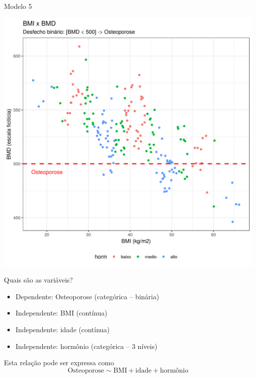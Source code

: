 \documentclass{beamer}
\begin{document}
\begin{frame}{\scriptsize Modelo 5}
  \begin{center}
    \includegraphics[height=.9\textheight]{Cap31-32/pratica-glm5}
  \end{center}
\end{frame}

\begin{frame}{\scriptsize Quais são as variáveis?}
  \begin{itemize}
  \item \alert{Dependente: Osteoporose (categórica -- binária)}
  \item Independente: BMI (contínua)
  \item Independente: idade (contínua)
  \item Independente: hormônio (categórica -- 3 níveis)
  \end{itemize}
  \vfill
  \begin{block}{Esta relação pode ser expressa como}
    \footnotesize
    \begin{displaymath}
      \text{Osteoporose} \sim \text{BMI} + \text{idade} +\text{hormônio}
    \end{displaymath}
  \end{block}
\end{frame}
\end{document}
